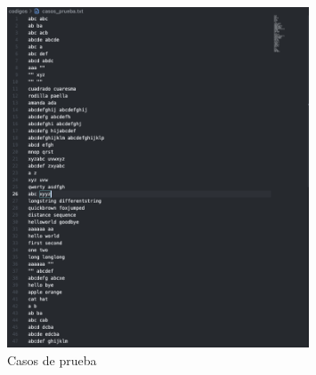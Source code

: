 \begin{figure}[H]
    \centering
    \includegraphics[width=0.8\textwidth]{images/teststrings.png}
    \caption{Casos de prueba}
    \label{fig:teststrings}
\end{figure}